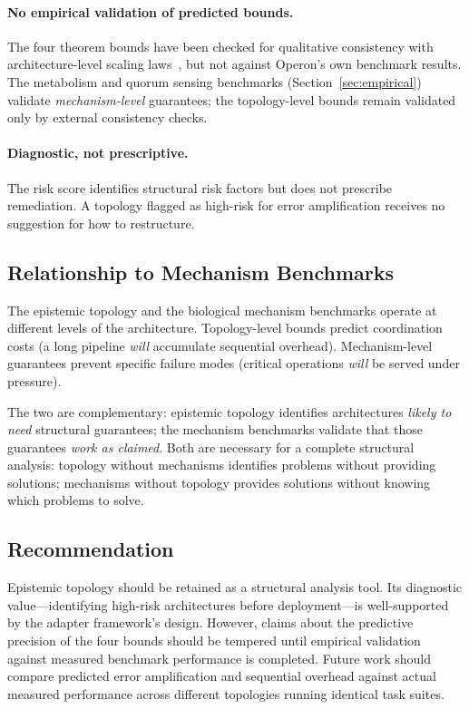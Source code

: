 \documentclass[11pt]{article}
\begin{document}
\paragraph{No empirical validation of predicted bounds.}
The four theorem bounds have been checked for qualitative consistency
with architecture-level scaling laws~\cite{kim2025scaling}, but not
against Operon's own benchmark results.  The metabolism and quorum
sensing benchmarks (Section~\ref{sec:empirical}) validate
\emph{mechanism-level} guarantees; the topology-level bounds remain
validated only by external consistency checks.

\paragraph{Diagnostic, not prescriptive.}
The risk score identifies structural risk factors but does not prescribe
remediation.  A topology flagged as high-risk for error amplification
receives no suggestion for how to restructure.

\subsection{Relationship to Mechanism Benchmarks}

The epistemic topology and the biological mechanism benchmarks operate
at different levels of the architecture.  Topology-level bounds predict
coordination costs (a long pipeline \emph{will} accumulate sequential
overhead).  Mechanism-level guarantees prevent specific failure modes
(critical operations \emph{will} be served under pressure).

The two are complementary: epistemic topology identifies architectures
\emph{likely to need} structural guarantees; the mechanism benchmarks
validate that those guarantees \emph{work as claimed}.  Both are
necessary for a complete structural analysis: topology without
mechanisms identifies problems without providing solutions; mechanisms
without topology provides solutions without knowing which problems to
solve.

\subsection{Recommendation}

Epistemic topology should be retained as a structural analysis tool.
Its diagnostic value---identifying high-risk architectures before
deployment---is well-supported by the adapter framework's design.
However, claims about the predictive precision of the four bounds
should be tempered until empirical validation against measured
benchmark performance is completed.  Future work should compare
predicted error amplification and sequential overhead against actual
measured performance across different topologies running identical
task suites.

\newpage


\end{document}
